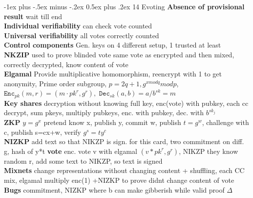 \documentclass[10pt,landscape]{article}
\makeatletter
\renewcommand{\section}{\@startsection{section}{1}{0mm}%
                                {-1ex plus -.5ex minus -.2ex}%
                                {0.5ex plus .2ex}%
                                {\normalfont\large\bfseries}}
\makeatother
\begin{document}
\begin{multicols*}{4}
\section{14 Evoting}
\textbf{Absence of provisional result} wait till end\\
\textbf{Individual verifiability} can check vote counted\\
\textbf{Universal verifiability} all votes correctly counted\\
\textbf{Control components} Gen. keys on 4 different setup, 1 trusted at least\\
\textbf{NKZIP} used to prove blinded vote same vote as encrypted and then mixed, correctly decrypted, know content of vote\\
\textbf{Elgamal} Provide multiplicative homomorphism, reencrypt with 1 to get anonymity, Prime order subgroup, $p=2q+1, g^{x mod q}mod p$, $\texttt{Enc}_{pk}(m,r)=(m\cdot pk^r, g^r), \texttt{ Dec}_{sk}(a,b)=a/b^{sk}=m$\\
\textbf{Key shares} decryption without knowing full key, enc(vote) with pubkey, each cc decrypt, sum pkeys, multiply pubkeys, enc. with pubkey, dec. with $b^{sk_j}$\\
\textbf{ZKP} $y=g^x$ pretend know x, publish y, commit w, publish $t=g^w$, challenge with c, publish s=cx+w, verify $g^s=ty^c$\\
\textbf{NIZKP} add text so that NIKZP is sign. for this card, two commitment on diff. g, hash of y*t
\textbf{vote} enc. vote v with elgamal $(v*pk^r, g^r)$, NIKZP they know random r, add some text to NIKZP, so text is signed\\
\textbf{Mixnets} change representations without changing content + shuffling, each CC mix, elgamal multiply enc(1) +NIZKP to prove didnt change content of vote\\
\textbf{Bugs} commitment, NIZKP where b can make gibberish while valid proof
$\Delta $
\end{multicols*}
\end{document}
